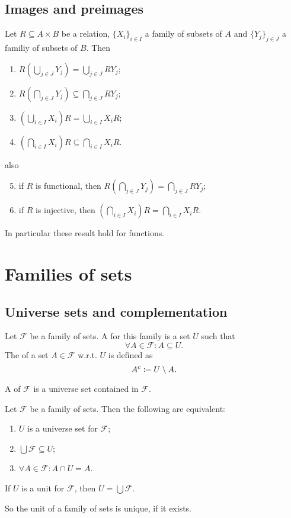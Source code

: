 \subsection{Images and preimages}
\begin{lemma}
Let $R \subseteq A\times B$ be a relation, $\{X_i\}_{i\in I}$ a family of subsets of $A$ and $\{Y_j\}_{j\in J}$ a familiy of subsets of $B$. Then
\begin{enumerate}
\item $R\left(\bigcup_{j\in J} Y_j\right) = \bigcup_{j\in J} RY_j$;
\item $R\left(\bigcap_{j\in J} Y_j\right) \subseteq \bigcap_{j\in J} RY_j$;
\item $\left(\bigcup_{i\in I} X_i\right)R = \bigcup_{i\in I} X_iR$;
\item $\left(\bigcap_{i\in I} X_i\right)R \subseteq \bigcap_{i\in I} X_iR$.
\end{enumerate}
also
\begin{enumerate} \setcounter{enumi}{4}
\item if $R$ is functional, then $R\left(\bigcap_{j\in J} Y_j\right) = \bigcap_{j\in J} RY_j$;
\item if $R$ is injective, then $\left(\bigcap_{i\in I} X_i\right)R = \bigcap_{i\in I} X_iR$.
\end{enumerate}
\end{lemma}
In particular these result hold for functions.


\section{Families of sets}
\subsection{Universe sets and complementation}
\begin{definition}
Let $\mathcal{F}$ be a family of sets. A  for this family is a set $U$ such that
\[ \forall A\in \mathcal{F}: A \subseteq U. \]
The  of a set $A\in\mathcal{F}$ w.r.t. $U$ is defined as
\[ A^c \coloneqq U\setminus A. \]

A  of $\mathcal{F}$ is a universe set contained in $\mathcal{F}$.
\end{definition}
\begin{lemma}
Let $\mathcal{F}$ be a family of sets. Then the following are equivalent:
\begin{enumerate}
\item $U$ is a universe set for $\mathcal{F}$;
\item $\bigcup\mathcal{F} \subseteq U$;
\item $\forall A\in \mathcal{F}: A\cap U = A$.
\end{enumerate}
If $U$ is a unit for $\mathcal{F}$, then $U=\bigcup\mathcal{F}$.
\end{lemma}
So the unit of a family of sets is unique, if it exists.

